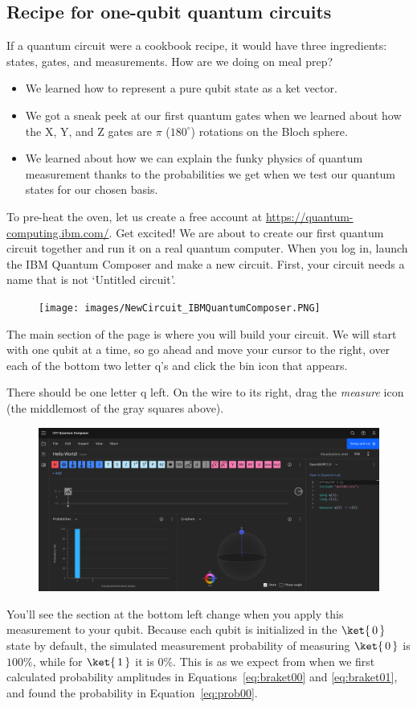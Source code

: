 \documentclass{article}
\theoremstyle{definition}
\newcommand{\kz}[1]{\ket{\,#1\,}}
\begin{document}
\subsection{Recipe for one-qubit quantum circuits}
If a quantum circuit were a cookbook recipe, it would have three ingredients: states, gates, and measurements.
How are we doing on meal prep?
\begin{itemize}
	\item We learned how to represent a pure qubit state as a ket vector.
	\item We got a sneak peek at our first quantum gates when we learned about how the X, Y, and Z gates are $\pi$ ($180^{\circ}$) rotations on the Bloch sphere.
	\item We learned about how we can explain the funky physics of quantum measurement thanks to the probabilities we get when we test our quantum states for our chosen basis.
\end{itemize}
To pre-heat the oven, let us create a free account at \url{https://quantum-computing.ibm.com/}.  Get excited!  We are about to create our first quantum circuit together and run it on a real quantum computer.
When you log in, launch the IBM Quantum Composer and make a new circuit.
First, your circuit needs a name that is not `Untitled circuit'.
\begin{figure}[H]
	\texttt{[image: images/NewCircuit\_IBMQuantumComposer.PNG]}
\end{figure}
The main section of the page is where you will build your circuit.  We will start with one qubit at a time, so go ahead and move your cursor to the right, over each of the bottom two letter q's and click the bin icon that appears.

There should be one letter q left.  On the wire to its right, drag the \textit{measure} icon (the middlemost of the gray squares above).
\begin{figure}[H]
	\includegraphics[width=\columnwidth]{images/Measure_IBMQuantumComposer.PNG}
\end{figure}
You'll see the section at the bottom left change when you apply this measurement to your qubit.  Because each qubit is initialized in the $\kz0$ state by default, the simulated measurement probability of measuring $\kz0$ is $100\%$, while for $\kz1$ it is $0\%$.  This is as we expect from when we first calculated probability amplitudes in Equations~\ref{eq:braket00} and \ref{eq:braket01}, and found the probability in Equation~\ref{eq:prob00}.
\end{document}
